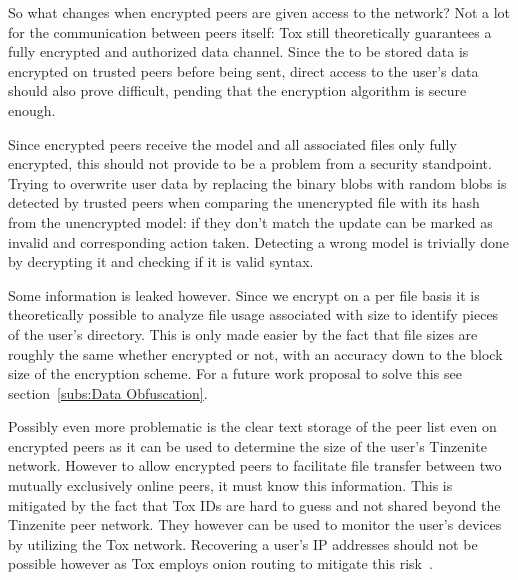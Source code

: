 So what changes when encrypted peers are given access to the network?
Not a lot for the communication between peers itself: Tox still theoretically guarantees a fully encrypted and authorized data channel.
Since the to be stored data is encrypted on trusted peers before being sent, direct access to the user's data should also prove difficult, pending that the encryption algorithm is secure enough.

Since encrypted peers receive the model and all associated files only fully encrypted, this should not provide to be a problem from a security standpoint.
Trying to overwrite user data by replacing the binary blobs with random blobs is detected by trusted peers when comparing the unencrypted file with its hash from the unencrypted model: if they don't match the update can be marked as invalid and corresponding action taken.
Detecting a wrong model is trivially done by decrypting it and checking if it is valid syntax.

Some information is leaked however.
Since we encrypt on a per file basis it is theoretically possible to analyze file usage associated with size to identify pieces of the user's directory.
This is only made easier by the fact that file sizes are roughly the same whether encrypted or not, with an accuracy down to the block size of the encryption scheme.
For a future work proposal to solve this see section~\ref{subs:Data Obfuscation}.

Possibly even more problematic is the clear text storage of the peer list even on encrypted peers as it can be used to determine the size of the user's Tinzenite network.
However to allow encrypted peers to facilitate file transfer between two mutually exclusively online peers, it must know this information.
This is mitigated by the fact that Tox IDs are hard to guess and not shared beyond the Tinzenite peer network.
They however can be used to monitor the user's devices by utilizing the Tox network.
Recovering a user's IP addresses should not be possible however as Tox employs onion routing to mitigate this risk~\cite{web:site:tox:wiki:onion}.
